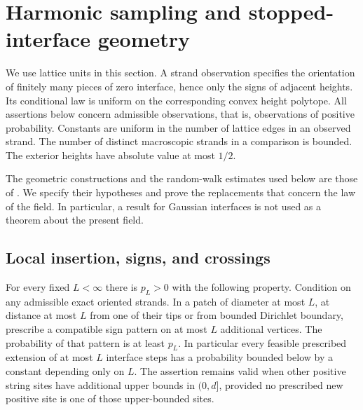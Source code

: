 \section{Harmonic sampling and stopped-interface geometry}
\label{sec:geometry}

We use lattice units in this section. A strand observation specifies the
orientation of finitely many pieces of zero interface, hence only the signs
of adjacent heights. Its conditional law is uniform on the corresponding
convex height polytope. All assertions below concern admissible observations,
that is, observations of positive probability. Constants are uniform in
the number of lattice edges in an observed strand. The number of distinct
macroscopic strands in a comparison is bounded. The exterior heights have
absolute value at most \(1/2\).

The geometric constructions and the random-walk estimates used below are
those of \cite[Sections 2.3 and 3.3--3.7]{SSdiscrete}. We specify their
hypotheses and prove the replacements that concern the law of the field.
In particular, a result for Gaussian interfaces is not used as a theorem
about the present field.

\subsection{Local insertion, signs, and crossings}

\begin{lemma}\label{g:insertion}
For every fixed \(L<\infty\) there is \(p_L>0\) with the following property.
Condition on any admissible exact oriented strands. In a patch of diameter
at most \(L\), at distance at most \(L\) from one of their tips or from
bounded Dirichlet boundary, prescribe a compatible sign pattern on at most
\(L\) additional vertices. The probability of that pattern is at least
\(p_L\). In particular every feasible prescribed extension of at most
\(L\) interface steps has a probability bounded below by a constant
depending only on \(L\). The assertion remains valid when other positive
string sites have additional upper bounds in \((0,d]\), provided no
prescribed new positive site is one of those upper-bounded sites.
\end{lemma}

